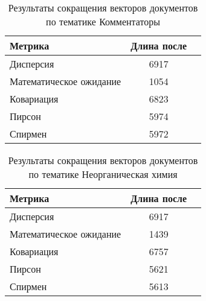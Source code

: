 \begin{table}[H]
    \centering
    \begin{tabular}{|l|c|c|}
    \hline
    \textbf{Метрика}                                  & \textbf{Длина после}             \\ \hline
    Дисперсия                                         & 6917                             \\ \hline
    Математическое ожидание                           & 1054                             \\ \hline
    Ковариация                                        & 6823                             \\ \hline
    Пирсон                                            & 5974                             \\ \hline
    Спирмен                                           & 5972                             \\ \hline
    \end{tabular}
    \caption{Результаты сокращения векторов документов по тематике Комментаторы}
    \label{tab:similarity}
\end{table}

\begin{table}[H]
    \centering
    \begin{tabular}{|l|c|c|}
    \hline
    \textbf{Метрика}                                  & \textbf{Длина после}             \\ \hline
    Дисперсия                                         & 6917                             \\ \hline
    Математическое ожидание                           & 1439                             \\ \hline
    Ковариация                                        & 6757                             \\ \hline
    Пирсон                                            & 5621                             \\ \hline
    Спирмен                                           & 5613                             \\ \hline
    \end{tabular}
    \caption{Результаты сокращения векторов документов по тематике Неорганическая химия}
    \label{tab:similarity}
\end{table}

